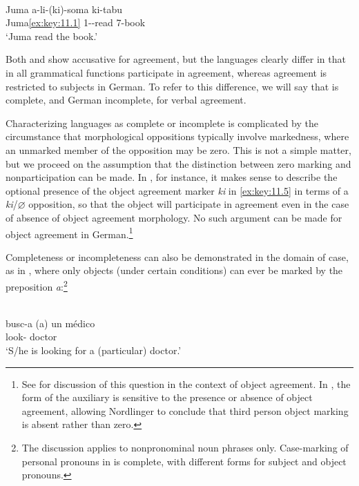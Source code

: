\documentclass[output=paper]{langsci/langscibook}
\begin{document}
\ea%
    \label{ex:key:11.5} \parencite[18]{Barrett-Keach1980}\\
    \gll Juma    a-li-(ki)-soma  ki-tabu\\
        Juma\eqref{ex:key:11.1}  1--read    7-book\\
    \glt ‘Juma read the book.’
\z

Both  and  show accusative  for
agreement, but the languages clearly differ in that in  all
grammatical functions participate in agreement, whereas agreement is restricted
to subjects in German. To refer to this difference, we will say that
 is complete, and German incomplete, for verbal agreement.

Characterizing languages as complete or incomplete is complicated by the
circumstance that morphological oppositions typically involve markedness, where
an unmarked member of the opposition may be zero. This is not a simple matter,
but we proceed on the assumption that the distinction between zero marking and
nonparticipation can be made. In , for instance, it makes sense to
describe the optional presence of the object agreement marker \emph{ki} in \eqref{ex:key:11.5}
in terms of a \emph{ki}/${\varnothing}$ opposition, so that the object will
participate in agreement even in the case of absence of object agreement
morphology. No such argument can be made for object agreement in
German.\footnote{See \citet[146]{Nordlinger1998} for discussion of this
    question in the context of  object agreement. In , the
form of the auxiliary is sensitive to the presence or absence of object
agreement, allowing Nordlinger to conclude that third person object marking is
absent rather than zero.\label{fn:5}}

Completeness or incompleteness can also be demonstrated in the domain of case,
as in , where only objects (under certain conditions) can ever be marked
by the preposition \emph{a}:\footnote{The discussion applies to 
    nonpronominal noun phrases only. Case-marking of personal pronouns in
     is complete, with different forms for subject and object
pronouns.\label{fn:6}}

\ea%
    \label{ex:key:11.6} {\parencite[80]{Leonetti2004}}\\
    \gll busc-a    (a)  un  médico\\
    look-\Tsg{} \hphantom{(}\Obj{} \Indef{}  doctor\\
    \glt ‘S/he is looking for a (particular) doctor.’
\z
\end{document}
